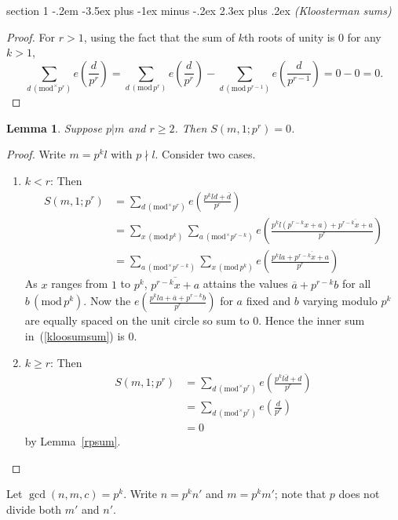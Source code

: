 \documentclass[12pt]{article}
\makeatletter
\theoremstyle{norm}
\newtheorem{lem}[thm]{Lemma}
\newcommand{\pa}[1]{\left( {#1} \right)}
\newcommand{\pf}[2]{\pa{\frac{#1}{#2}}}
\newcommand{\ol}[1]{\overline{#1}}
\newcommand{\mmod}[1]{\,(\text{mod}^{\times} #1)}
\newcommand{\nmod}[1]{\,(\text{mod}\, #1)}
\newenvironment{problem}{\@startsection
       {section}
       {1}
       {-.2em}
       {-3.5ex plus -1ex minus -.2ex}
       {2.3ex plus .2ex}
       {\pagebreak[3]%
       \large\bf\noindent{Problem }
       }
       }
       {%
       }
\makeatother
\begin{document}
\begin{problem}{\it (Kloosterman sums)}
\begin{proof}
For $r>1$, using the fact that the sum of $k$th roots of unity is 0 for any $k>1$, \[\sum_{d\mmod{p^r}} e\pf{d}{p^r}=\sum_{d\nmod{p^r}}e\pf{d}{p^r}-\sum_{d\nmod{p^{r-1}}}e\pf{d}{p^{r-1}}=0-0=0.\]
\end{proof}
\begin{lem}\label{p4-2-l2}
Suppose $p|m$ and $r\geq 2$. Then $S(m,1;p^r)=0$.
\end{lem}
\begin{proof}
Write $m=p^kl$ with $p\nmid l$. Consider two cases.
\begin{enumerate}
\item
$k<r$: Then
\begin{align}
\nonumber
S(m,1;p^r)&=\sum_{d\mmod{p^r}} e\pf{p^kld+\ol d}{p^r}\\
\nonumber
&=\sum_{x\nmod{p^k}}\sum_{a\mmod{p^{r-k}}} e
\pf{p^kl(p^{r-k}x+a)+\ol{p^{r-k}x+a}}{p^r}\\
\label{kloosumsum}
&=\sum_{a\mmod{p^{r-k}}} \sum_{x\nmod{p^k}}e
\pf{p^kla+\ol{p^{r-k}x+a}}{p^r}
\end{align}
As $x$ ranges from $1$ to $p^{k}$, $\ol{p^{r-k}x+a}$ attains the values $\ol{a}+p^{r-k}b$ for all $b\nmod{p^k}$. Now the $e
\pf{p^kla+\ol{a}+p^{r-k}b}{p^r}$ for $a$ fixed and $b$ varying modulo $p^k$ are equally spaced on the unit circle so sum to 0. Hence the inner sum in~(\ref{kloosumsum}) is 0.
\item
$k \geq r$: Then
\begin{align*}
S(m,1;p^r)&=\sum_{d\mmod{p^r}} e\pf{p^kl\ol d+d}{p^r}\\
&=\sum_{d\mmod{p^r}} e
\pf{d}{p^r}\\
&=0
\end{align*}
by Lemma~\ref{rpsum}.
\end{enumerate}
\end{proof}
Let $\gcd(n,m,c)=p^k$. Write $n=p^kn'$ and $m=p^km'$; note that $p$ does not divide both $m'$ and $n'$. 



\end{problem}
\end{document}

